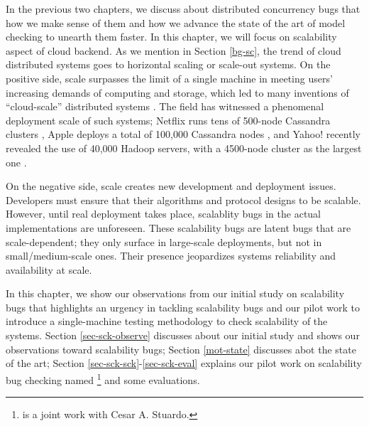 
In the previous two chapters, we discuss about distributed concurrency bugs
that how we make sense of them and how we advance the state of the art of model
checking to unearth them faster. In this chapter, we will focus on
scalability aspect of cloud backend. As we mention in Section \ref{bg-sc}, the
trend of cloud distributed systems goes to horizontal scaling or scale-out systems.
On the positive side, scale surpasses the limit of a single machine in
meeting users' increasing demands of computing and storage, which led to
many inventions of ``cloud-scale'' distributed systems
\cite{Chang+06-BigTable, 
DeanGhemawat04-MapReduce, 
DeCandia+07-Dynamo,
Ghemawat+03-GoogleFS, 
Hindman+11-Mesos,
Verma+15-Borg}. The field has witnessed a
phenomenal deployment scale of such systems;
%
Netflix runs tens of 500-node Cassandra clusters \cite{RunningNetflix13},
Apple deploys a total of 100,000 Cassandra nodes \cite{WikiCassandra}, 
and Yahoo! recently revealed the use of 40,000 Hadoop servers,
with a 4500-node cluster as the largest one \cite{LargestHadoop}.

On the negative side, scale creates new development and deployment issues.
Developers must ensure that their algorithms and protocol designs to be
scalable.  However, until real deployment takes place, scalablity bugs in the
actual implementations are unforeseen.
These scalability bugs are latent bugs that are scale-dependent; they only
surface in large-scale deployments, but not in small/medium-scale ones. Their
presence jeopardizes systems reliability and availability at scale.

In this chapter, we show our observations from our initial study on scalability
bugs that highlights an urgency in tackling scalability bugs and our pilot work
to introduce a single-machine testing methodology to check scalability of the
systems. Section \ref{sec-sck-observe} discusses about our initial study and shows our
observations toward scalability bugs; Section \ref{mot-state} discusses abot the state
of the art; Section \ref{sec-sck-sck}-\ref{sec-sck-eval} explains our pilot work on scalability
bug checking named \sck
\footnote{
\sck is a joint work with Cesar A. Stuardo.
} and some evaluations.


